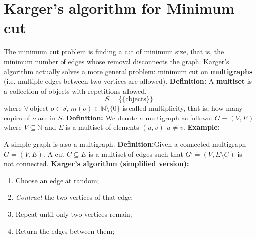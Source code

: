 \section{Karger's algorithm for Minimum cut}
The minimum cut problem is finding a cut of minimum size, that is, the minimum number of edges whose removal disconnects the graph.\newline\newline
Karger's algorithm actually solves a more general problem: minimum cut on \textbf{multigraphs} (i.e. multiple edges between two vertices are allowed).\newline\newline
\textbf{Definition:} A \textbf{multiset} is a collection of objects with repetitions allowed.
\[S = \{\{\text{objects}\}\}\]
where $\forall \, \text{object }o \in S$, $m(o) \in \mathbb{N} \setminus \{0\}$ is called multiplicity, that is, how many copies of $o$ are in $S$.\newline\newline
\textbf{Definition:} We denote a multigraph as follows: $G = (V, E)$ where $V \subseteq \mathbb{N}$ and $E$ is a multiset of elements $(u,v)\,\, u \neq v$.\newline\newline
\textbf{Example:}\newline\newline
{}\newline\newline
A simple graph is also a multigraph.\newline\newline
\textbf{Definition:}Given a connected multigraph $G = (V, E)$. A cut $C \subseteq E$ is a multiset of edges such that $G' = (V, E \setminus C)$ is not connected.\newline\newline
\textbf{Karger's algorithm (simplified version):}
\begin{enumerate}
    \item Choose an edge at random;
    \item \textit{Contract} the two vertices of that edge;
    \item Repeat until only two vertices remain;
    \item Return the edges between them;
\end{enumerate}
